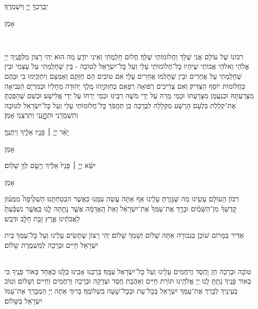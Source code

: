 \documentclass[twoside, openany, parskip=half, 11pt]{book}
\begin{document}
יְבָרֶכְךָ֥ יְיָ֖ וְיִשְׁמְרֶֽךָ׃ \kahal \begin{large} אָמֵן \end{large}
\\
\begin{footnotesize}
רִבּוֹנוֹ שֶׁל עוֹלָם אֲנִי שֶׁלָּךְ וַחֲלוֹמוֹתַי שֶׁלָּךְ׃ חֲלוֹם חָלַֽמְתִּי וְאֵינִי יוֹדֵֽעַ מַה הוּא׃ יְהִי רָצוֹן מִלְּפָנֶֽיךָ יְיָ אֱלֹהַי וֵאלֹהֵי אֲבוֹתַי שֶׁיִּהְיוּ כׇּל־חֲלוֹמוֹתַי עָלַי וְעַל כׇּל־יִשְׂרָאֵל לְטוֹבָה - בֵּין שֶׁחָלַֽמְתִּי עַל עַצְמִי וּבֵין שֶׁחָלַֽמְתִּי עַל אֲחֵרִים וּבֵין שֶׁחָלְמוּ אֲחֵרִים עָלָי׃ אִם טוֹבִים הֵם חַזְּקֵם וְאַמְּצֵם וְיִתְקַיְּמוּ בִי וּבָהֶם כַּחֲלוֹמוֹת יוֹסֵף הַצַּדִּיק׃ וְאִם צְרִיכִים רְפוּאָה רְפָאֵם כְּחִזְקִיָּֽהוּ מֶֽלֶךְ יְהוּדָה מֵחָלְיוֹ וּכְמִרְיָם הַנְּבִיאָה מִצָּרַעְתָּהּ וּכְנַעֲמָן מִצָּרַעְתּוֹ וּכְמֵי מָרָה עַל יְדֵי מֹשֶׁה רַבֵּֽינוּ וּכְמֵי יְרִחוֹ עַל יְדֵי אֱלִישָׁע׃ וּכְשֵׁם שֶׁהָפַֽכְתָּ אֶת־קִלְלַת בִּלְעָם הָרָשָׁע מִקְּלָלָה לִבְרָכָה כֵּן תַּהֲפֹךְ כׇּל־חֲלוֹמוֹתַי עָלַי וְעַל כׇּל־יִשְׂרָאֵל לְטוֹבָה וְתִשְׁמְרֵֽנִי וּתְחׇׇׇׇׇׇנֵּֽנִי וְתִרְצֵֽנִי׃ אָמֵן׃
\end{footnotesize}

יָאֵ֨ר יְיָ֧ ׀ פָּנָ֛יו אֵלֶ֖יךָ וִֽיחֻנֶּֽךָּ׃\kahal \begin{large} אָמֵן \end{large}

יִשָּׂ֨א יְיָ֤ ׀ פָּנָיו֙ אֵלֶ֔יךָ וְיָשֵׂ֥ם לְךָ֖ שָׁלֽוֹם׃\kahal \begin{large} אָמֵן \end{large}

\begin{paracol}{2}
רִבּוֹן הָעוֹלָם עָשִֽׂינוּ מַה שֶּׁגָּזַֽרְתָּ עָלֵֽינוּ אַף אַתָּה עֲשֵׂה עִמָּֽנוּ כַּאֲשֶׁר הִבְטַחְתָּֽנוּ׃ הַשְׁקִ֩יפָה֩ מִמְּע֨וֹן קׇדְשְׁךָ֜ מִן־הַשָּׁמַ֗יִם וּבָרֵ֤ךְ אֶֽת־עַמְּךָ֙ אֶת־יִשְׂרָאֵ֔ל וְאֵת֙ הָֽאֲדָמָ֔ה אֲשֶׁ֥ר נָתַ֖תָּה לָ֑נוּ כַּֽאֲשֶׁ֤ר נִשְׁבַּ֨עְתָּ֙ לַֽאֲבֹתֵ֔ינוּ אֶ֛רֶץ זָבַ֥ת חָלָ֖ב וּדְבָֽשׁ׃

\switchcolumn

\kahal
אַדִּיר בַּמָּרוֹם שׁוֹכֵן בִּגְבוּרָה אַתָּה שָׁלוֹם וְשִׁמְךָ שָׁלוֹם׃ יְהִי רָצוֹן שֶׁתָּשִׂים עָלֵֽינוּ וְעַל כׇּל־עַמְּךָ בֵּית יִשְׂרָאֵל חַיִּים וּבְרָכָה לְמִשְׁמֶֽרֶת שָׁלוֹם׃
\end{paracol}



\shatz\\
טוֹבָה וּבְרָכָה חֵן וָחֶֽסֶד וְרַחֲמִים עָלֵֽינוּ וְעַל כׇּל־יִשְׂרָאֵל עַמֶּֽךָ׃ בָּרְכֵנוּ אָבִֽינוּ כֻּלָּֽנוּ כְּאֶחָד בְּאוֹר פָּנֶֽיךָ כִּי בְאוֹר פָּנֶֽיךָ נָתַֽתָּ לָֽנוּ יְיָ אֱלֹהֵֽינוּ תּוֹרַת חַיִּים וְאַהֲבַת חֶֽסֶד וּצְדָקָה וּבְרָכָה וְרַחֲמִים וְחַיִּים וְשָׁלוֹם׃ וְטוֹב בְּעֵינֶֽיךָ לְבָרֵךְ אֶת־עַמְּךָ יִשְׂרָאֵל בְּכׇל־עֵת וּבְכׇל־שָׁעָה בִּשְׁלוֹמֶֽךָ׃ בָּרוּךְ אַתָּה יְיָ הַמְבָרֵךְ אֶת־עַמּוֹ יִשְׂרָאֵל בַּשָּׁלוֹם׃
\end{document}
